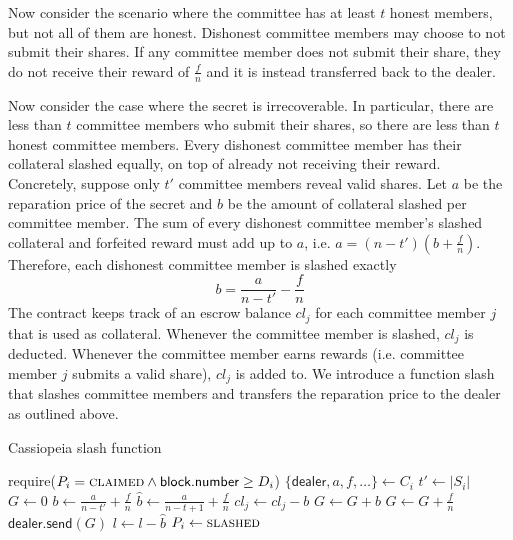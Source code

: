 Now consider the scenario where the committee has at least $t$ honest members, but not all of them are honest.
Dishonest committee members may choose to not submit their shares.
If any committee member does not submit their share, they do not receive their reward of $\frac{f}{n}$ and it is instead transferred back to the dealer.

Now consider the case where the secret is irrecoverable.
In particular, there are less than $t$ committee members who submit their shares, so there are less than $t$ honest committee members.
Every dishonest committee member has their collateral slashed equally, on top of already not receiving their reward.
Concretely, suppose only $t'$ committee members reveal valid shares.
Let $a$ be the reparation price of the secret and $b$ be the amount of collateral slashed per committee member.
The sum of every dishonest committee member's slashed collateral and forfeited reward must add up to $a$, i.e. $a = (n - t')(b + \frac{f}{n})$.
Therefore, each dishonest committee member is slashed exactly
\begin{equation}\label{eq:slash_amount}
    b = \frac{a}{n - t'} - \frac{f}{n}
\end{equation}
The contract keeps track of an escrow balance $cl_j$ for each committee member $j$ that is used as collateral.
Whenever the committee member is slashed, $cl_j$ is deducted.
Whenever the committee member earns rewards (i.e. committee member $j$ submits a valid share), $cl_j$ is added to.
We introduce a function \textsf{slash} that slashes committee members and transfers the reparation price to the dealer as outlined above.

\begin{algorithm}[H]
\caption{Cassiopeia \textsf{slash} function}
    \begin{algorithmic}[1]
                \State require($P_i = \textsc{claimed} \land \textsf{block.number} \geq D_i$)
                \State $\{\textsf{dealer}, a, f, \dots\} \gets C_i$
                \State $t' \gets |S_i|$
                \State $G \gets 0$
                \State $b \gets \frac{a}{n - t'} + \frac{f}{n}$ 
                \State $\hat{b} \gets \frac{a}{n - t + 1} + \frac{f}{n}$ 
                            \State $cl_j \gets cl_j - b$
                            \State $G \gets G + b$
                        \EndIf
                        \State $G \gets G + \frac{f}{n}$
                    \EndIf
                \EndFor
                \State $\textsf{dealer.send}(G)$
                \State $l \gets l - \hat{b}$ 
                \State $P_i \gets \textsc{slashed}$
            \EndFunction
    \end{algorithmic}
\end{algorithm}

